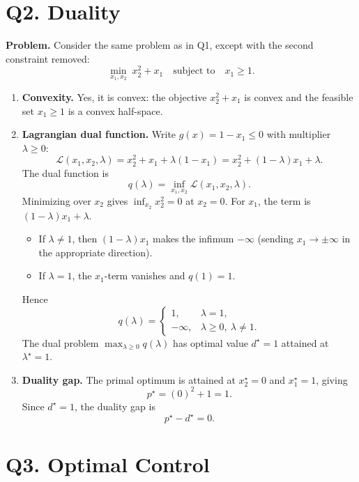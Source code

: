 \documentclass[11pt]{article}
\begin{document}
\section*{Q2. Duality}

\noindent \textbf{Problem.} Consider the same problem as in Q1, except with the second constraint removed:
\[
\min_{x_1,x_2}\; x_2^2+x_1
\quad\text{subject to}\quad
x_1\ge 1.
\]

\begin{enumerate}[label=(\alph*)]

\item \textbf{Convexity.} Yes, it is convex: the objective $x_2^2+x_1$ is convex and the feasible set $x_1\ge 1$ is a convex half-space.

\item \textbf{Lagrangian dual function.} Write $g(x)=1-x_1\le 0$ with multiplier $\lambda\ge 0$:
\[
\mathcal{L}(x_1,x_2,\lambda)=x_2^2+x_1+\lambda(1-x_1)=x_2^2+(1-\lambda)x_1+\lambda.
\]
The dual function is
\[
q(\lambda)=\inf_{x_1,x_2}\mathcal{L}(x_1,x_2,\lambda).
\]
Minimizing over $x_2$ gives $\inf_{x_2}x_2^2=0$ at $x_2=0$. For $x_1$, the term is $(1-\lambda)x_1+\lambda$.
\begin{itemize}
\item If $\lambda\neq 1$, then $(1-\lambda)x_1$ makes the infimum $-\infty$ (sending $x_1\to\pm\infty$ in the appropriate direction).
\item If $\lambda=1$, the $x_1$-term vanishes and $q(1)=1$.
\end{itemize}
Hence
\[
q(\lambda)=
\begin{cases}
1, & \lambda=1,\\
-\infty, & \lambda\ge 0,\ \lambda\neq 1.
\end{cases}
\]
The dual problem $\max_{\lambda\ge 0}q(\lambda)$ has optimal value $d^\star=1$ attained at $\lambda^\star=1$.

\item \textbf{Duality gap.} The primal optimum is attained at $x_2^\star=0$ and $x_1^\star=1$, giving
\[
p^\star = (0)^2 + 1 = 1.
\]
Since $d^\star=1$, the duality gap is
\[
p^\star-d^\star = 0.
\]

\end{enumerate}

\section*{Q3. Optimal Control}
\end{document}
